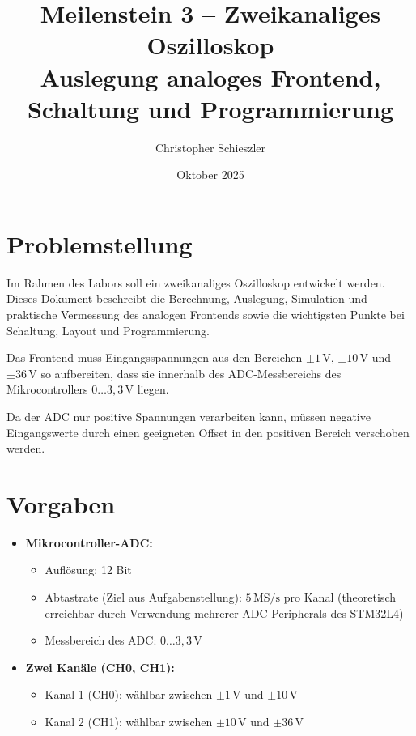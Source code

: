 \documentclass{article}
\title{Meilenstein 3 – Zweikanaliges Oszilloskop\\
	Auslegung analoges Frontend, Schaltung und Programmierung}
\author{Christopher Schieszler}
\date{Oktober 2025}
\begin{document}
	
	\maketitle
	\tableofcontents
	\newpage
	
	\section{Problemstellung}
	
	Im Rahmen des Labors soll ein zweikanaliges Oszilloskop entwickelt werden. 
	Dieses Dokument beschreibt die Berechnung, Auslegung, Simulation und praktische Vermessung des analogen Frontends sowie die wichtigsten Punkte bei Schaltung, Layout und Programmierung.
	
	Das Frontend muss Eingangsspannungen aus den Bereichen  
	\(\pm 1\,\mathrm{V}\), \(\pm 10\,\mathrm{V}\) und \(\pm 36\,\mathrm{V}\) so aufbereiten,  
	dass sie innerhalb des ADC-Messbereichs des Mikrocontrollers  
	\(0\dots 3{,}3\,\mathrm{V}\) liegen.
	
	Da der ADC nur positive Spannungen verarbeiten kann, müssen negative Eingangswerte
	durch einen geeigneten Offset in den positiven Bereich verschoben werden.
	
	\section{Vorgaben}
	
	\begin{itemize}
		\item \textbf{Mikrocontroller-ADC:}
		\begin{itemize}
			\item Auflösung: 12 Bit
			\item Abtastrate (Ziel aus Aufgabenstellung): \(5\,\mathrm{MS/s}\) pro Kanal  
			(theoretisch erreichbar durch Verwendung mehrerer ADC-Peripherals des STM32L4)
			\item Messbereich des ADC: \(0\dots 3{,}3\,\mathrm{V}\)
		\end{itemize}
		\item \textbf{Zwei Kanäle (CH0, CH1):}
		\begin{itemize}
			\item Kanal 1 (CH0): wählbar zwischen \(\pm 1\,\mathrm{V}\) und \(\pm 10\,\mathrm{V}\)
			\item Kanal 2 (CH1): wählbar zwischen \(\pm 10\,\mathrm{V}\) und \(\pm 36\,\mathrm{V}\)
		\end{itemize}
	\end{itemize}
	
\end{document}
